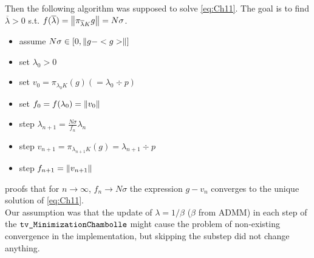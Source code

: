 Then the following algorithm was supposed to solve \ref{eq:Ch11}. The goal is to find $\overline{\lambda} > 0$ s.t. $f(\overline{\lambda}) = \left\lVert\pi_{\overline{\lambda}K}g\right\rVert = N \sigma$.
\begin{itemize}
    \item assume $N \sigma \in [0, \left\lVert g-<g>\right\rVert]$
    \item set $\lambda_0 > 0$
    \item set $v_0 = \pi_{\lambda_0 K}(g) (=\lambda_0 \div p)$
    \item set $f_0 = f(\lambda_0) = \left\lVert v_0\right\rVert$
    \item step $\lambda_{n+1} = \frac{N \sigma}{f_n} \lambda_n$
    \item step $v_{n+1} = \pi_{\lambda_{n+1}K}(g) = \lambda_{n+1} \div p$
    \item step $f_{n+1} = \left\lVert v_{n+1}\right\rVert$
\end{itemize}

\cite[Theorem 4.2]{MR2049783} proofs that for $n \to \infty$, $f_n \to N \sigma$ the expression $g-v_n$ converges to the unique solution of \ref{eq:Ch11}.\\

Our assumption was that the update of $\lambda = 1/ \beta$ ($\beta$ from ADMM) in each step of the $\texttt{tv\_MinimizationChambolle}$ might cause the problem of non-existing convergence in the implementation, but skipping the substep did not change anything.

